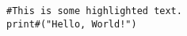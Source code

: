 \documentclass{article}
\begin{document}
\begin{lstlisting}
#This is some highlighted text.
print#("Hello, World!")
\end{lstlisting}
\end{document}
